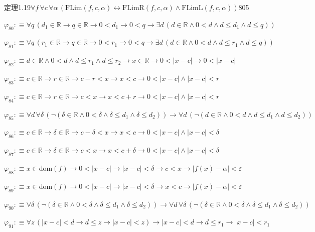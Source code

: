 \begin{fullproof}{定理1.19}{$\forall f\,\forall c\,\forall \alpha\,(\mathrm{FLim}(f,c,\alpha) \leftrightarrow \mathrm{FLimR}(f,c,\alpha) \land \mathrm{FLimL}(f,c,\alpha))$}{805}
\begin{abbrevlist}
\item $\varphi_{80} :\equiv \forall q\,(d_{1} \in \mathbb{R} \to q \in \mathbb{R} \to 0 < d_{1} \to 0 < q \to \exists d\,(d \in \mathbb{R} \land 0 < d \land d \leq d_{1} \land d \leq q))$
\item $\varphi_{81} :\equiv \forall q\,(r_{1} \in \mathbb{R} \to q \in \mathbb{R} \to 0 < r_{1} \to 0 < q \to \exists d\,(d \in \mathbb{R} \land 0 < d \land d \leq r_{1} \land d \leq q))$
\item $\varphi_{82} :\equiv d \in \mathbb{R} \land 0 < d \land d \leq r_{1} \land d \leq r_{2} \to x \in \mathbb{R} \to 0 < \lvert x - c \rvert \to 0 < \lvert x - c \rvert$
\item $\varphi_{83} :\equiv c \in \mathbb{R} \to r \in \mathbb{R} \to c - r < x \to x < c \to 0 < \lvert x - c \rvert \land \lvert x - c \rvert < r$
\item $\varphi_{84} :\equiv c \in \mathbb{R} \to r \in \mathbb{R} \to c < x \to x < c + r \to 0 < \lvert x - c \rvert \land \lvert x - c \rvert < r$
\item $\varphi_{85} :\equiv \forall d\,\forall \delta\,(\neg (\delta \in \mathbb{R} \land 0 < \delta \land \delta \leq d_{1} \land \delta \leq d_{2})) \to \forall d\,(\neg (d \in \mathbb{R} \land 0 < d \land d \leq d_{1} \land d \leq d_{2}))$
\item $\varphi_{86} :\equiv c \in \mathbb{R} \to \delta \in \mathbb{R} \to c - \delta < x \to x < c \to 0 < \lvert x - c \rvert \land \lvert x - c \rvert < \delta$
\item $\varphi_{87} :\equiv c \in \mathbb{R} \to \delta \in \mathbb{R} \to c < x \to x < c + \delta \to 0 < \lvert x - c \rvert \land \lvert x - c \rvert < \delta$
\item $\varphi_{88} :\equiv x \in \mathrm{dom}(f) \to 0 < \lvert x - c \rvert \to \lvert x - c \rvert < \delta \to c < x \to \lvert f(x) - \alpha \rvert < \varepsilon$
\item $\varphi_{89} :\equiv x \in \mathrm{dom}(f) \to 0 < \lvert x - c \rvert \to \lvert x - c \rvert < \delta \to x < c \to \lvert f(x) - \alpha \rvert < \varepsilon$
\item $\varphi_{90} :\equiv \forall \delta\,(\neg (\delta \in \mathbb{R} \land 0 < \delta \land \delta \leq d_{1} \land \delta \leq d_{2})) \to \forall d\,\forall \delta\,(\neg (\delta \in \mathbb{R} \land 0 < \delta \land \delta \leq d_{1} \land \delta \leq d_{2}))$
\item $\varphi_{91} :\equiv \forall z\,(\lvert x - c \rvert < d \to d \leq z \to \lvert x - c \rvert < z) \to \lvert x - c \rvert < d \to d \leq r_{1} \to \lvert x - c \rvert < r_{1}$

\end{abbrevlist}
\end{fullproof}
